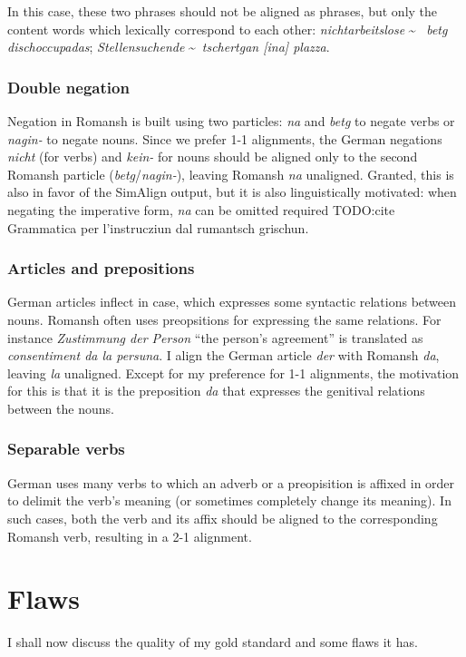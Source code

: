 In this case, these two phrases should not be aligned as phrases, but only the content words which lexically correspond to each other: \emph{nichtarbeitslose} \textasciitilde ~ \emph{betg dischoccupadas}; \emph{Stellensuchende} \textasciitilde ~\emph{tschertgan [ina] plazza}.

\subsubsection{Double negation}
Negation in Romansh is built using two particles: \emph{na} and \emph{betg} to negate verbs or \emph{nagin-} to negate nouns. 
Since we prefer 1-1 alignments, the German negations \emph{nicht} (for verbs) and \emph{kein-} for nouns should be aligned only to the second Romansh particle (\emph{betg}/\emph{nagin-}), leaving Romansh \emph{na} unaligned. 
Granted, this is also in favor of the SimAlign output, but it is also linguistically motivated: when negating the imperative form, \emph{na} can be omitted required TODO:cite Grammatica per l’instrucziun dal rumantsch grischun. 

\subsubsection{Articles and prepositions}
German articles inflect in case, which expresses some syntactic relations between nouns. 
Romansh often uses preopsitions for expressing the same relations. 
For instance \emph{Zustimmung der Person} \enquote{the person's agreement} is translated as \emph{consentiment da la persuna}. 
I align the German article \emph{der} with Romansh \emph{da}, leaving \emph{la} unaligned. 
Except for my preference for 1-1 alignments, the motivation for this is that it is the preposition \emph{da} that expresses the genitival relations between the nouns.

\subsubsection{Separable verbs}
German uses many verbs to which an adverb or a preopisition is affixed in order to delimit the verb's meaning (or sometimes completely change its meaning). 
In such cases, both the verb and its affix should be aligned to the corresponding Romansh verb, resulting in a 2-1 alignment.

\section{Flaws}
I shall now discuss the quality of my gold standard and some flaws it has.

